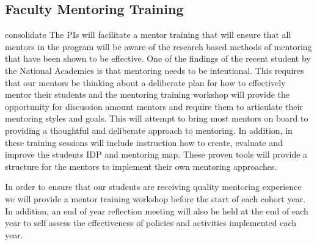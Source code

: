 \documentclass[12pt]{article}
\newcommand\reword[1]{{\color{red}#1}}
\begin{document}
\subsection{Faculty Mentoring Training}\label{sect:facultytraining}

\reword{consolidate} The PIs will facilitate a mentor training that will ensure that all mentors in the program will be aware of the research based methods of mentoring that have been shown to be effective.  One of the findings of the recent student by the National Academies is that mentoring needs to be intentional.  This requires that our mentors be thinking about a deliberate plan for how to effectively mentor their students and the mentoring training workshop will provide the opportunity for discussion amount mentors and require them to articulate their mentoring styles and goals. This will attempt to bring most mentors on board to providing a thoughtful and deliberate approach to mentoring.  In addition, in these training sessions will include instruction how to create, evaluate and improve the students IDP and mentoring map. These proven tools will provide a structure for the mentors to implement their own mentoring approaches.   


 In order to ensure that our students are receiving quality mentoring experience we will provide a mentor training workshop before the start of each cohort year.  In addition, an end of year reflection meeting will also be held at the end of each year to self assess the effectiveness of policies and activities implemented each year.
\end{document}
